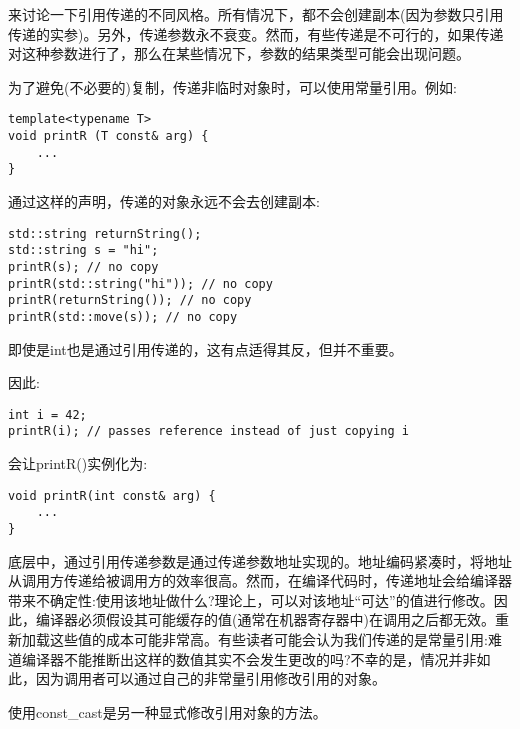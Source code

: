 
来讨论一下引用传递的不同风格。所有情况下，都不会创建副本(因为参数只引用传递的实参)。另外，传递参数永不衰变。然而，有些传递是不可行的，如果传递对这种参数进行了，那么在某些情况下，参数的结果类型可能会出现问题。


为了避免(不必要的)复制，传递非临时对象时，可以使用常量引用。例如:

\begin{lstlisting}[style=styleCXX]
template<typename T>
void printR (T const& arg) {
	...
}
\end{lstlisting}

通过这样的声明，传递的对象永远不会去创建副本:

\begin{lstlisting}[style=styleCXX]
std::string returnString();
std::string s = "hi";
printR(s); // no copy
printR(std::string("hi")); // no copy
printR(returnString()); // no copy
printR(std::move(s)); // no copy
\end{lstlisting}

即使是int也是通过引用传递的，这有点适得其反，但并不重要。

因此:

\begin{lstlisting}[style=styleCXX]
int i = 42;
printR(i); // passes reference instead of just copying i
\end{lstlisting}

会让printR()实例化为:

\begin{lstlisting}[style=styleCXX]
void printR(int const& arg) {
	...
}
\end{lstlisting}

底层中，通过引用传递参数是通过传递参数地址实现的。地址编码紧凑时，将地址从调用方传递给被调用方的效率很高。然而，在编译代码时，传递地址会给编译器带来不确定性:使用该地址做什么?理论上，可以对该地址“可达”的值进行修改。因此，编译器必须假设其可能缓存的值(通常在机器寄存器中)在调用之后都无效。重新加载这些值的成本可能非常高。有些读者可能会认为我们传递的是常量引用:难道编译器不能推断出这样的数值其实不会发生更改的吗?不幸的是，情况并非如此，因为调用者可以通过自己的非常量引用修改引用的对象。

\begin{tcolorbox}[colback=webgreen!5!white,colframe=webgreen!75!black]
\hspace*{0.75cm}使用const\_cast是另一种显式修改引用对象的方法。
\end{tcolorbox}

